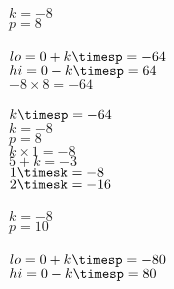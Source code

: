 \documentclass{article}
\begin{document}
$k=-8$\\
$p=8$\\
\\$lo=0+k\timesp=-64$\\
$hi=0-k\timesp=64$\\
$-8\times8=-64$\\
\\$k\timesp=-64$\\
$k=-8$\\
$p=8$\\
$k\times1=-8$\\
$5+k=-3$\\
$1\timesk=-8$\\
$2\timesk=-16$\\
\\$k=-8$\\
$p=10$\\
\\$lo=0+k\timesp=-80$\\
$hi=0-k\timesp=80$\\
\end{document}
